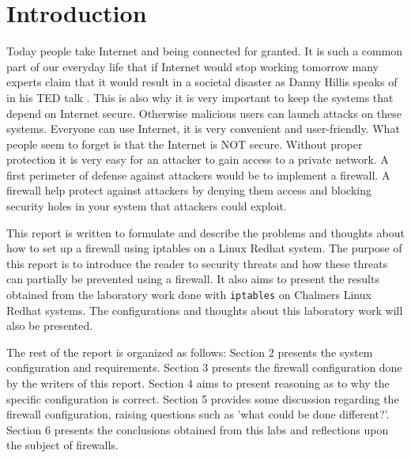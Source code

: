 \section{Introduction} 
\label{sec:intro}
Today people take Internet and being connected for granted. It is such a common part of our everyday life that if Internet would stop working tomorrow many experts claim that it would result in a societal disaster as Danny Hillis speaks of in his TED talk \cite{hillis13}. This is also why it is very important to keep the systems that depend on Internet secure. Otherwise malicious users can launch attacks on these systems. Everyone can use Internet, it is very convenient and user-friendly. What people seem to forget is that the Internet is NOT secure. Without proper protection it is very easy for an attacker to gain access to a private network. A first perimeter of defense against attackers would be to implement a firewall. A firewall help protect against attackers by denying them access and blocking security holes in your system that attackers could exploit.

This report is written to formulate and describe the problems and thoughts about how to set up a firewall using iptables on a Linux Redhat system. The purpose of this report is to introduce the reader to security threats and how these threats can partially be prevented using a firewall. It also aims to present the results obtained from the laboratory work done with \verb;iptables; on Chalmers Linux Redhat systems. The configurations and thoughts about this laboratory work will also be presented.

The rest of the report is organized as follows: Section 2 presents the system configuration and requirements. Section 3 presents the firewall configuration done by the writers of this report. Section 4 aims to present reasoning as to why the specific configuration is correct. Section 5 provides some discussion regarding the firewall configuration, raising questions such as 'what could be done different?'. Section 6 presents the conclusions obtained from this labs and reflections upon the subject of firewalls.



